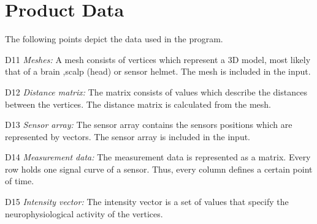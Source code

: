 \section{Product Data}
The following points depict the data used in the program.
	\begin{aims}
		\item[D11] \textit{Meshes:} A mesh consists of vertices which represent a 3D model, most likely that of a brain ,scalp (head) or sensor helmet. The mesh is included in the input.
		
		\item[D12] \textit{Distance matrix:} The matrix consists of values which describe the distances between the vertices. The distance matrix is calculated from the mesh.
		
		\item[D13] \textit{Sensor array:} The sensor array contains the sensors positions which are represented by vectors. The sensor array is included in the input.
		
		\item[D14] \textit{Measurement data:} The measurement data is represented as a matrix. Every row holds one signal curve of a sensor. Thus, every column defines a certain point of time.
		
		\item[D15] \textit{Intensity vector:} The intensity vector is a set of values that specify the neurophysiological activity of the vertices.
	\end{aims}